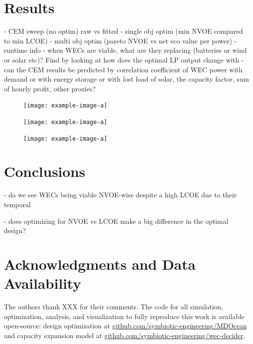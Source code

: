\documentclass[10pt,twoside]{article}
\begin{document}
\section{Results}
    -  CEM sweep (no optim) raw vs fitted
    -  single obj optim (min NVOE compared to min LCOE)
    -  multi obj optim (pareto NVOE vs net eco value per power)
    -  runtime info
    -  when WECs are viable, what are they replacing (batteries or wind or solar etc)? Find by looking at how does the optimal LP output change with
    -  can the CEM results be predicted by correlation coefficient of WEC power with demand or with energy storage or with lost load of solar, the capacity factor, sum of hourly profit, other proxies?

\begin{figure}[b]
\noindent
\begin{minipage}[t]{0.32\textwidth}
    \centering
    \texttt{[image: example-image-a]}
    \label{fig:cem-results}
\end{minipage}
\hfill
\begin{minipage}[t]{0.32\textwidth}
    \centering
    \texttt{[image: example-image-a]}
    \label{fig:single-obj-compare}
\end{minipage}
\hfill
\begin{minipage}[t]{0.32\textwidth}
    \centering
    \texttt{[image: example-image-a]}
    \label{fig:pareto}
\end{minipage}
\end{figure}

\lipsum[1-4]

\section{Conclusions}
\lipsum[1]

- do we see WECs being viable NVOE-wise despite a high LCOE due to their temporal

- does optimizing for NVOE vs LCOE make a big difference in the optimal design?

\section*{Acknowledgments and Data Availability}
The authors thank XXX for their comments. The code for all simulation, optimization, analysis, and visualization to fully reproduce this work is available open-source: design optimization at \url{github.com/symbiotic-engineering/MDOcean} and capacity expansion model at \url{github.com/symbiotic-engineering/wec-decider}.
\end{document}
